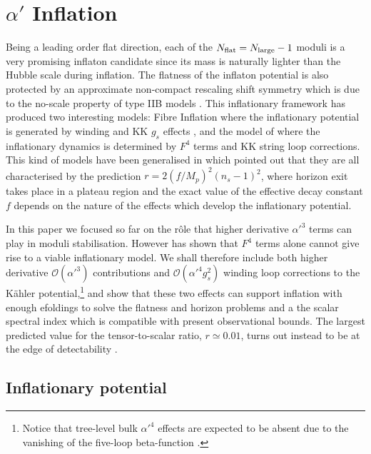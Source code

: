 \documentclass[11pt,a4paper]{article}
\newcommand{\mc}{\mathcal}
\begin{document}
\section{$\alpha'$ Inflation}
\label{Sec2}

Being a leading order flat direction, each of the $N_{\rm flat}=N_{\rm large}-1$ moduli is a very promising inflaton candidate since its mass is naturally lighter than the Hubble scale during inflation. The flatness of the inflaton potential is also protected by an approximate non-compact rescaling shift symmetry which is due to the no-scale property of type IIB models \cite{Burgess:2014tja}. This inflationary framework has produced two interesting models: Fibre Inflation where the inflationary potential is generated by winding and KK $g_s$ effects \cite{Cicoli:2008va}, and the model of \cite{Broy:2015zba}
where the inflationary dynamics is determined by $F^4$ terms and KK string loop corrections. This kind of models have been generalised in \cite{Burgess:2016owb} which pointed out that they are all characterised by the prediction $r= 2 (f/M_p)^2 (n_s-1)^2$, where horizon exit takes place in a plateau region and the exact value of the effective decay constant $f$ depends on the nature of the effects which develop the inflationary potential.  

In this paper we focused so far on the r\^ole that higher derivative $\alpha'^3$ terms can play in moduli stabilisation. However \cite{Broy:2015zba} has shown that $F^4$ terms alone cannot give rise to a viable inflationary model. We shall therefore include both higher derivative $\mc{O}(\alpha'^3)$ contributions and $\mc{O}(\alpha'^4 g_s^2)$ winding loop corrections to the K\"ahler potential,\footnote{Notice that tree-level bulk $\alpha'^4$ effects are expected to be absent \cite{Halverson:2013qca} due to the vanishing of the five-loop beta-function \cite{Grisaru:1986wj}.} and show that these two effects can support inflation with enough efoldings to solve the flatness and horizon problems and a the scalar spectral index which is compatible with present observational bounds. The largest predicted value for the tensor-to-scalar ratio, $r\simeq 0.01$, turns out instead to be at the edge of detectability \cite{rForecasts}. 


\subsection{Inflationary potential}
\end{document}

